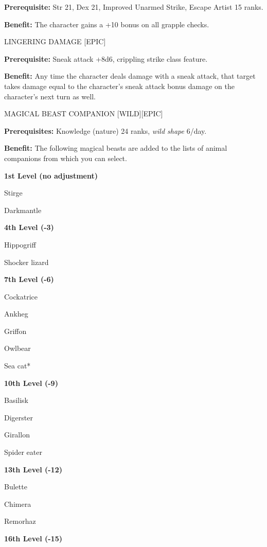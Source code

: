 \documentclass{article}
\begin{document}
\textbf{Prerequisite:} Str 21, Dex 21, Improved Unarmed Strike, Escape Artist 15 
ranks. 

\textbf{Benefit:} The character gains a +10 bonus on all grapple checks. 

\vspace{12pt}
LINGERING DAMAGE [EPIC] 

\textbf{Prerequisite:} Sneak attack +8d6, crippling strike class feature. 

\textbf{Benefit:} Any time the character deals damage with a sneak attack, that 
target takes damage equal to the character's sneak attack bonus damage on the character's 
next turn as well. 

\vspace{12pt}
MAGICAL BEAST COMPANION [WILD][EPIC] 

\textbf{Prerequisites:} Knowledge (nature) 24 ranks, \textit{wild shape }6/day. 

\textbf{Benefit:} The following magical beasts are added to the lists of animal 
companions from which you can select.

\textbf{1st Level (no adjustment)} 

Stirge

Darkmantle

\vspace{12pt}
\textbf{4th Level (-3)}

Hippogriff

Shocker lizard

\vspace{12pt}
\textbf{7th Level (-6)}

Cockatrice

Ankheg

Griffon

Owlbear

Sea cat*

\vspace{12pt}
\textbf{10th Level (-9)}

Basilisk

Digerster

Girallon

Spider eater

\vspace{12pt}
\textbf{13th Level (-12)}

Bulette

Chimera

Remorhaz

\vspace{12pt}
\textbf{16th Level (-15)}
\end{document}
